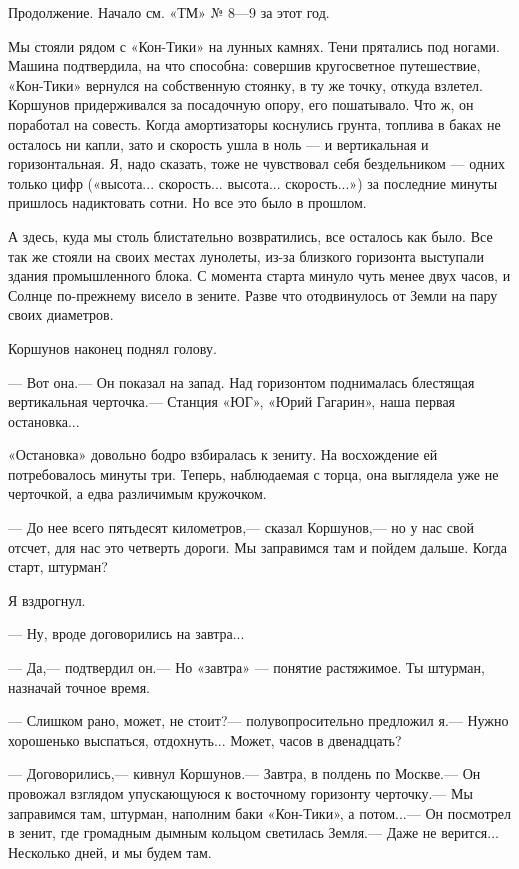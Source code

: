 \documentclass[11pt,a4paper,oneside]{article}
\begin{document}
Продолжение. Начало см. «ТМ» № 8—9 за этот год.

Мы стояли рядом с «Кон-Тики» на лунных камнях. Тени прятались под ногами. Машина подтвердила, на что способна: совершив кругосветное путешествие, «Кон-Тики» вернулся на собственную стоянку, в ту же точку, откуда взлетел. Коршунов придерживался за посадочную опору, его пошатывало. Что ж, он поработал на совесть. Когда амортизаторы коснулись грунта, топлива в баках не осталось ни капли, зато и скорость ушла в ноль — и вертикальная и горизонтальная. Я, надо сказать, тоже не чувствовал себя бездельником — одних только цифр («высота... скорость... высота... скорость...») за последние минуты пришлось надиктовать сотни. Но все это было в прошлом.

А здесь, куда мы столь блистательно возвратились, все осталось как было. Все так же стояли на своих местах лунолеты, из-за близкого горизонта выступали здания промышленного блока. С момента старта минуло чуть менее двух часов, и Солнце по-прежнему висело в зените. Разве что отодвинулось от Земли на пару своих диаметров.

Коршунов наконец поднял голову.

— Вот она.— Он показал на запад. Над горизонтом поднималась блестящая вертикальная черточка.— Станция «ЮГ», «Юрий Гагарин», наша первая остановка...

«Остановка» довольно бодро взбиралась к зениту. На восхождение ей потребовалось минуты три. Теперь, наблюдаемая с торца, она выглядела уже не черточкой, а едва различимым кружочком.

— До нее всего пятьдесят километров,— сказал Коршунов,— но у нас свой отсчет, для нас это четверть дороги. Мы заправимся там и пойдем дальше. Когда старт, штурман?

Я вздрогнул.

— Ну, вроде договорились на завтра...

— Да,— подтвердил он.— Но «завтра» — понятие растяжимое. Ты штурман, назначай точное время.

— Слишком рано, может, не стоит?— полувопросительно предложил я.— Нужно хорошенько выспаться, отдохнуть... Может, часов в двенадцать?

— Договорились,— кивнул Коршунов.— Завтра, в полдень по Москве.— Он провожал взглядом упускающуюся к восточному горизонту черточку.— Мы заправимся там, штурман, наполним баки «Кон-Тики», а потом...— Он посмотрел в зенит, где громадным дымным кольцом светилась Земля.— Даже не верится... Несколько дней, и мы будем там.
\end{document}
